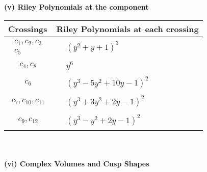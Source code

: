 \documentclass[1p]{elsarticle_modified}
\theoremstyle{definition}
\begin{document}
\newpage\renewcommand{\arraystretch}{1}
\flushleft \textbf{(v) Riley Polynomials at the component}\newline \\
\begin{tabular}{m{50pt}|m{274pt}}
Crossings & \hspace{64pt}Riley Polynomials at each crossing \\
\hline $$\begin{aligned}c_{1},c_{2},c_{3}\\c_{5}\end{aligned}$$&$\begin{aligned}
&(y^2+y+1)^3
\end{aligned}$\\
\hline $$\begin{aligned}c_{4},c_{8}\end{aligned}$$&$\begin{aligned}
&y^6
\end{aligned}$\\
\hline $$\begin{aligned}c_{6}\end{aligned}$$&$\begin{aligned}
&(y^3-5 y^2+10 y-1)^2
\end{aligned}$\\
\hline $$\begin{aligned}c_{7},c_{10},c_{11}\end{aligned}$$&$\begin{aligned}
&(y^3+3 y^2+2 y-1)^2
\end{aligned}$\\
\hline $$\begin{aligned}c_{9},c_{12}\end{aligned}$$&$\begin{aligned}
&(y^3- y^2+2 y-1)^2
\end{aligned}$\\
\hline
\end{tabular}\\~\\
\newpage\flushleft \textbf{(vi) Complex Volumes and Cusp Shapes}
\end{document}
